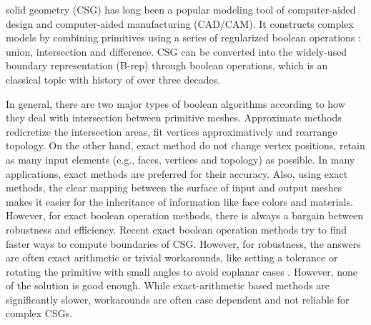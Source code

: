 \documentclass[10pt,journal,compsoc]{IEEEtran}
\begin{document}
\maketitle


\IEEEdisplaynontitleabstractindextext
\IEEEpeerreviewmaketitle

 solid geometry (CSG) has long been a popular modeling tool of computer-aided design and computer-aided manufacturing (CAD/CAM). It constructs complex models by combining primitives using a series of regularized boolean operations \cite{requicha1977mathematical,tilove1980closure}: union, intersection and difference. CSG can be converted into the widely-used boundary representation (B-rep) through boolean operations, which is an classical topic with history of over three decades.

In general, there are two major types of boolean algorithms according to how they deal with intersection between primitive meshes. Approximate methods redicretize the intersection areas, fit vertices approximatively and rearrange topology. On the other hand, exact method do not change vertex positions, retain as many input elements  (e.g., faces, vertices and topology) as possible. In many applications, exact methods are preferred for their accuracy. Also, using exact methods, the clear mapping between the surface of input and output meshes makes it easier for the inheritance of information like face colors and materials. However, for exact boolean operation methods, there is always a bargain between robustness and efficiency. Recent exact boolean operation methods try to find faster ways to compute boundaries of CSG. However, for robustness, the answers are often exact arithmetic \cite{barki2015exact,zhou2016mesh} or trivial workarounds, like setting a tolerance \cite{feito2013fast,segal1990using} or rotating the primitive with small angles to avoid coplanar cases \cite{douze2015quickcsg}. However, none of the solution is good enough. While exact-arithmetic based methods are significantly slower, workarounds are often case dependent and not reliable for complex CSGs.
\end{document}
